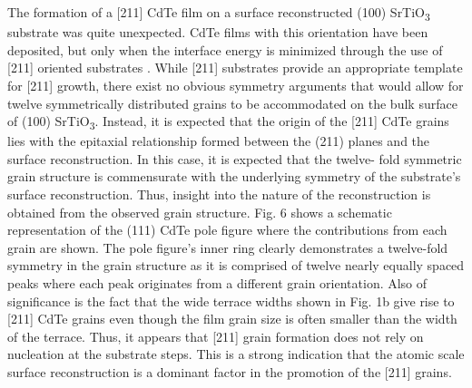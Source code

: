 The formation of a [211] CdTe film on a surface reconstructed
(100) SrTiO\textsubscript{3} substrate was quite unexpected. CdTe films with this
orientation have been deposited, but only when the interface
energy is minimized through the use of [211] oriented substrates
\cite{Lange1991b,Million1996,Rujirawat1997a,Zanatta1998}. While [211] substrates provide an appropriate template
for [211] growth, there exist no obvious symmetry arguments
that would allow for twelve symmetrically distributed grains to be
accommodated on the bulk surface of (100) SrTiO\textsubscript{3}. Instead, it is
expected that the origin of the [211] CdTe grains lies with the
epitaxial relationship formed between the (211) planes and the
surface reconstruction. In this case, it is expected that the twelve-
fold symmetric grain structure is commensurate with the underlying symmetry of the substrate’s surface reconstruction. Thus,
insight into the nature of the reconstruction is obtained from the
observed grain structure. Fig. 6 shows a schematic representation
of the (111) CdTe pole figure where the contributions from each
grain are shown. The pole figure’s inner ring clearly demonstrates a
twelve-fold symmetry in the grain structure as it is comprised of twelve nearly equally spaced peaks where each peak originates
from a different grain orientation. Also of significance is the fact
that the wide terrace widths shown in Fig. 1b give rise to [211]
CdTe grains even though the film grain size is often smaller than
the width of the terrace. Thus, it appears that [211] grain
formation does not rely on nucleation at the substrate steps. This is
a strong indication that the atomic scale surface reconstruction is a
dominant factor in the promotion of the [211] grains.


